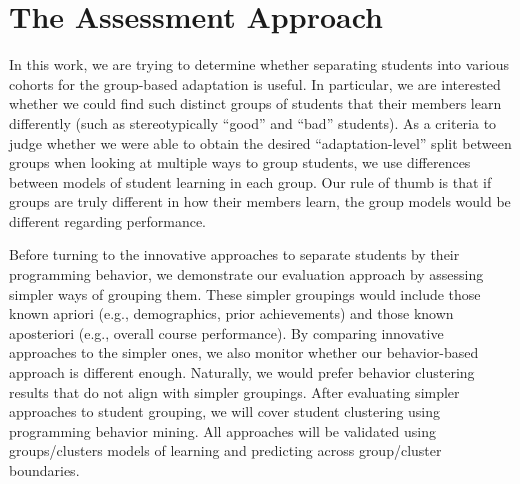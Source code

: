\documentclass{sigchi}
\begin{document}


\section{The Assessment Approach}

In this work, we are trying to determine whether separating students into various cohorts for the group-based adaptation is useful. In particular, we are interested whether we could find such distinct groups of students that their members learn differently (such as stereotypically ``good'' and ``bad'' students). As a criteria to judge whether we were able to obtain the desired ``adaptation-level'' split between groups when looking at multiple ways to group students, we use differences between models of student learning in each group. Our rule of thumb is that if groups are truly different in how their members learn, the group models would be different regarding performance. 

Before turning to the innovative approaches to separate students by their programming behavior, we demonstrate our evaluation approach by assessing simpler ways of grouping them. These simpler groupings would include those known apriori (e.g., demographics, prior achievements) and those known aposteriori (e.g., overall course performance). By comparing innovative approaches to the simpler ones, we also monitor whether our behavior-based approach is different enough. Naturally, we would prefer behavior clustering results that do not align with simpler groupings. After evaluating simpler approaches to student grouping, we will cover student clustering using programming behavior mining. All approaches will be validated using groups/clusters models of learning and predicting across group/cluster boundaries. %
\end{document}
